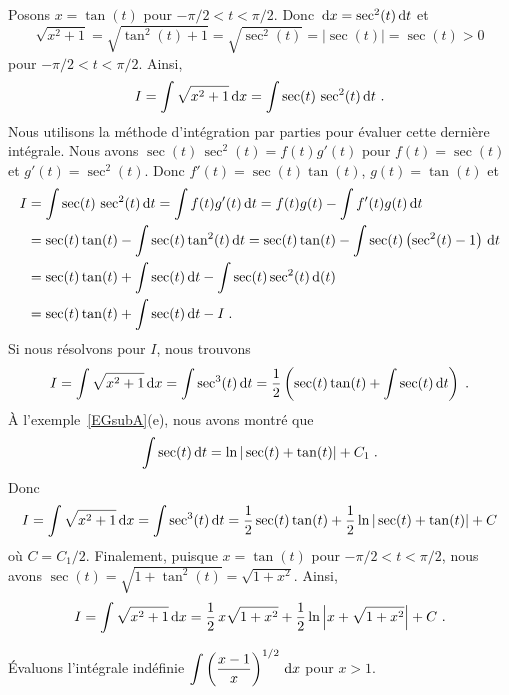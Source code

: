 {\begin{egg}
Posons $x=\tan(t)$ pour $-\pi/2 < t < \pi/2$.  Donc
$\,\mathrm{d}x = \sec^2(t) \,\mathrm{d}t$ et 
\[
\sqrt{x^2+1} = \sqrt{\tan^2(t) +1} = \sqrt{\sec^2(t)} = |\sec(t)| =
\sec(t) >0
\]
pour $-\pi/2 < t < \pi/2$.  Ainsi,
\[
I = \int \sqrt{x^2+1} \,\mathrm{d}x = \int \sec(t) \, \sec^2(t) \,\mathrm{d}t \ .
\]
Nous utilisons la méthode d'intégration par parties pour évaluer cette
dernière intégrale.  Nous avons $\sec(t) \, \sec^2(t) = f(t)g'(t)$ pour
$f(t)=\sec(t)$ et $g'(t) = \sec^2(t)$.  Donc $f'(t) = \sec(t)\tan(t)$,
$g(t) = \tan(t)$ et
\begin{align*}
I &= \int \sec(t) \, \sec^2(t) \,\mathrm{d}t = \int f(t) g'(t) \,\mathrm{d}t
= f(t)g(t) - \int f'(t) g(t) \,\mathrm{d}t \\
&= \sec(t) \tan(t) - \int \sec(t) \tan^2(t) \,\mathrm{d}t
= \sec(t) \tan(t) - \int \sec(t) \left(\sec^2(t) - 1\right) \,\mathrm{d}t\\
&= \sec(t) \tan(t) + \int \sec(t) \,\mathrm{d}t - \int \sec(t)\sec^2(t)\,\mathrm{d}(t) \\
&= \sec(t) \tan(t) + \int \sec(t) \,\mathrm{d}t - I  \; .
\end{align*}
Si nous résolvons pour $I$, nous trouvons
\[
I = \int \sqrt{x^2+1} \,\mathrm{d}x = \int \sec^3(t) \,\mathrm{d}t = \frac{1}{2} \left(
\sec(t) \tan(t) + \int \sec(t) \,\mathrm{d}t \right) \; .
\]
À l'exemple~\ref{EGsubA}(e), nous avons montré que
\[
\int \sec(t) \,\mathrm{d}t = \ln|\sec(t)+\tan(t)| + C_1 \; .
\]
Donc
\[
I = \int \sqrt{x^2+1} \,\mathrm{d}x = \int \sec^3(t) \,\mathrm{d}t =
\frac{1}{2} \sec(t) \tan(t) + \frac{1}{2} \ln|\sec(t)+\tan(t)| + C
\]
où $C=C_1/2$.  Finalement, puisque $x=\tan(t)$ pour $-\pi/2 < t < \pi/2$,
nous avons $\displaystyle \sec(t) = \sqrt{1+\tan^2(t)} = \sqrt{1+x^2}$.
Ainsi,
\[
I = \int \sqrt{x^2+1} \,\mathrm{d}x = \frac{1}{2}\, x\sqrt{1+x^2}
+ \frac{1}{2} \ln\left|x + \sqrt{1+x^2}\right| + C\ .
\]
\label{intSRQTxdpu}
\end{egg}

\begin{egg}
Évaluons l'intégrale indéfinie
$\displaystyle \int \left(\frac{x-1}{x}\right)^{1/2} \,\mathrm{d}x$
pour $x>1$.


\end{egg}}
